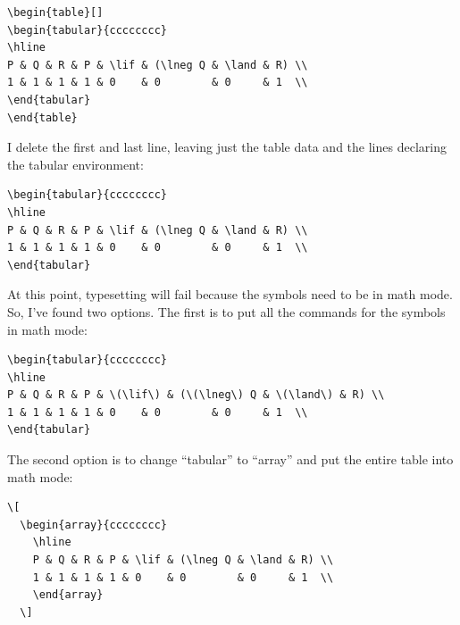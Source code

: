\documentclass[11pt]{article}
\begin{document}
\begin{verbatim}
\begin{table}[]
\begin{tabular}{cccccccc}
\hline
P & Q & R & P & \lif & (\lneg Q & \land & R) \\
1 & 1 & 1 & 1 & 0    & 0        & 0     & 1  \\
\end{tabular}
\end{table}
\end{verbatim}

I delete the first and last line, leaving just the table data and the lines declaring the tabular environment: 

\begin{verbatim}
\begin{tabular}{cccccccc}
\hline
P & Q & R & P & \lif & (\lneg Q & \land & R) \\
1 & 1 & 1 & 1 & 0    & 0        & 0     & 1  \\
\end{tabular}
\end{verbatim}


At this point, typesetting will fail because the symbols need to be in math mode. So, I've found two options. The first is to put all the commands for the symbols in math mode: 

\begin{verbatim}
\begin{tabular}{cccccccc}
\hline
P & Q & R & P & \(\lif\) & (\(\lneg\) Q & \(\land\) & R) \\
1 & 1 & 1 & 1 & 0    & 0        & 0     & 1  \\
\end{tabular}
\end{verbatim}

The second option is to change ``tabular'' to ``array'' and put the entire table into math mode:

\begin{verbatim}
\[
  \begin{array}{cccccccc}
    \hline
    P & Q & R & P & \lif & (\lneg Q & \land & R) \\
    1 & 1 & 1 & 1 & 0    & 0        & 0     & 1  \\
    \end{array}
  \]
\end{verbatim}
\end{document}
